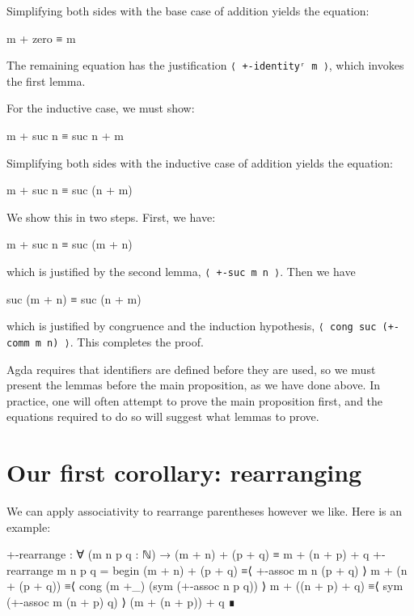 Simplifying both sides with the base case of addition yields the
equation:

\begin{myDisplay}
m + zero ≡ m
\end{myDisplay}

The remaining equation has the justification
\texttt{⟨\ +-identityʳ\ m\ ⟩}, which invokes the first lemma.

For the inductive case, we must show:

\begin{myDisplay}
m + suc n ≡ suc n + m
\end{myDisplay}

Simplifying both sides with the inductive case of addition yields the
equation:

\begin{myDisplay}
m + suc n ≡ suc (n + m)
\end{myDisplay}

We show this in two steps. First, we have:

\begin{myDisplay}
m + suc n ≡ suc (m + n)
\end{myDisplay}

which is justified by the second lemma, \texttt{⟨\ +-suc\ m\ n\ ⟩}. Then
we have

\begin{myDisplay}
suc (m + n) ≡ suc (n + m)
\end{myDisplay}

which is justified by congruence and the induction hypothesis,
\texttt{⟨\ cong\ suc\ (+-comm\ m\ n)\ ⟩}. This completes the proof.

Agda requires that identifiers are defined before they are used, so we
must present the lemmas before the main proposition, as we have done
above. In practice, one will often attempt to prove the main proposition
first, and the equations required to do so will suggest what lemmas to
prove.

\hypertarget{Induction-sections}{%
\section{Our first corollary: rearranging}\label{Induction-sections}}

We can apply associativity to rearrange parentheses however we like.
Here is an example:

\begin{fence}
\begin{code}
+-rearrange : ∀ (m n p q : ℕ) → (m + n) + (p + q) ≡ m + (n + p) + q
+-rearrange m n p q =
  begin
    (m + n) + (p + q)
  ≡⟨ +-assoc m n (p + q) ⟩
    m + (n + (p + q))
  ≡⟨ cong (m +_) (sym (+-assoc n p q)) ⟩
    m + ((n + p) + q)
  ≡⟨ sym (+-assoc m (n + p) q) ⟩
    (m + (n + p)) + q
  ∎
\end{code}
\end{fence}

